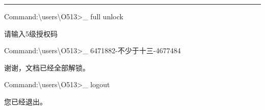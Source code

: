 \hrule


\begin{scpboxc}
Command:\textbackslash users\textbackslash O513>\_ full unlock
\end{scpboxc}


\begin{scpboxc}
请输入5级授权码
\end{scpboxc}


\begin{scpboxc}
Command:\textbackslash users\textbackslash O513>\_ 6471882-不少于十三-4677484
\end{scpboxc}


\begin{scpboxc}
谢谢，文档已经全部解锁。
\end{scpboxc}


\begin{scpboxc}
Command:\textbackslash users\textbackslash O513>\_ logout
\end{scpboxc}


\begin{scpboxc}
您已经退出。
\end{scpboxc}

\hr
